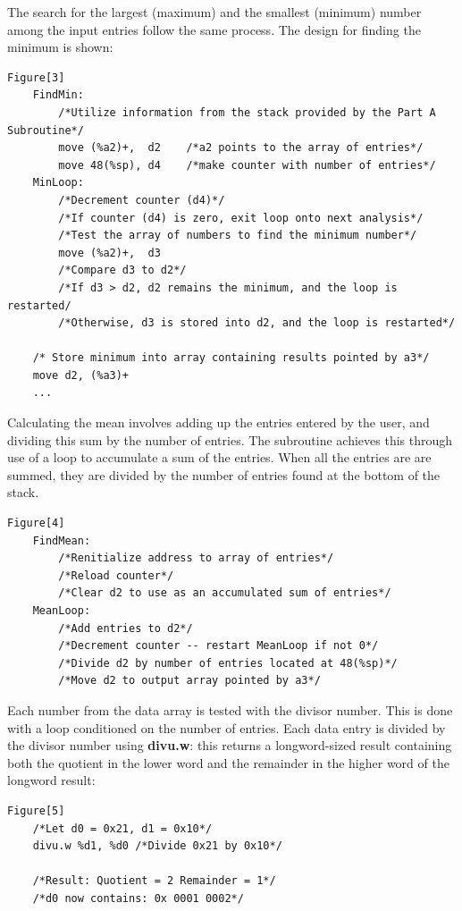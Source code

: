\documentclass[12pt]{article}
\begin{document}
The search for the largest (maximum) and the smallest (minimum) number among the input entries follow the same process. The design for finding the minimum is shown:

\begin{verbatim}
Figure[3] 
    FindMin:
        /*Utilize information from the stack provided by the Part A Subroutine*/
        move (%a2)+,  d2    /*a2 points to the array of entries*/
        move 48(%sp), d4    /*make counter with number of entries*/
    MinLoop:
        /*Decrement counter (d4)*/
        /*If counter (d4) is zero, exit loop onto next analysis*/
        /*Test the array of numbers to find the minimum number*/
        move (%a2)+,  d3
        /*Compare d3 to d2*/
        /*If d3 > d2, d2 remains the minimum, and the loop is restarted/
        /*Otherwise, d3 is stored into d2, and the loop is restarted*/
    
    /* Store minimum into array containing results pointed by a3*/
    move d2, (%a3)+
    ...
\end{verbatim}

Calculating the mean involves adding up the entries entered by the user, and dividing this sum by the number of entries. The subroutine achieves this through use of a loop to accumulate a sum of the entries. When all the entries are are summed, they are divided by the number of entries found at the bottom of the stack.

\begin{verbatim}
Figure[4]
    FindMean:
        /*Renitialize address to array of entries*/
        /*Reload counter*/
        /*Clear d2 to use as an accumulated sum of entries*/
    MeanLoop:
        /*Add entries to d2*/
        /*Decrement counter -- restart MeanLoop if not 0*/
        /*Divide d2 by number of entries located at 48(%sp)*/
        /*Move d2 to output array pointed by a3*/
\end{verbatim}

Each number from the data array is tested with the divisor number. This is done with a loop conditioned on the number of entries. Each data entry is divided by the divisor number using \textbf{divu.w}: this returns a longword-sized result containing both the quotient in the lower word and the remainder in the higher word of the longword result:

\begin{verbatim}
Figure[5]
    /*Let d0 = 0x21, d1 = 0x10*/
    divu.w %d1, %d0 /*Divide 0x21 by 0x10*/
    
    /*Result: Quotient = 2 Remainder = 1*/
    /*d0 now contains: 0x 0001 0002*/
\end{verbatim}
\end{document}
